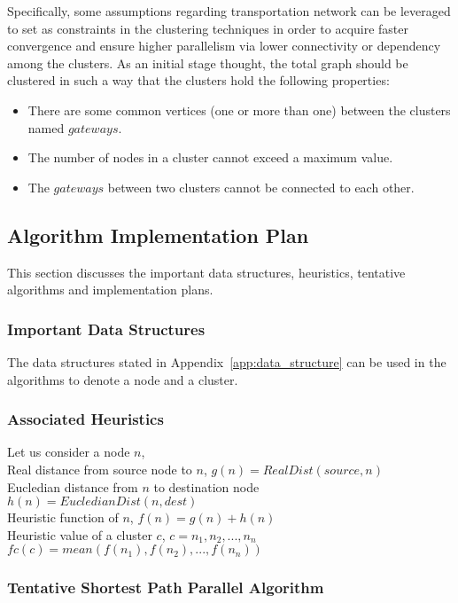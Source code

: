 Specifically, some assumptions regarding transportation network can be leveraged
to set as constraints in the clustering techniques in order to acquire
faster convergence and ensure higher parallelism via lower connectivity or dependency among
the clusters. As an initial stage thought, the total graph should be clustered
in such a way that the clusters hold the following properties:
\begin{itemize}
	\item There are some common vertices (one or more than one) between the clusters named $gateways$.
	\item The number of nodes in a cluster cannot exceed a maximum value.
	\item The $gateways$ between two clusters cannot be connected to each other.
\end{itemize}

\subsection{Algorithm Implementation Plan}

This section discusses the important data structures, heuristics,
tentative algorithms and implementation plans.

\subsubsection{Important Data Structures}

The data structures stated in Appendix~\ref{app:data_structure} can be used in 
the algorithms to denote a node and a cluster.

\subsubsection{Associated Heuristics}

Let us consider a node $n$,
\\Real distance from source node to $n$,
$g(n) = RealDist(source, n)$
\\Eucledian distance from $n$ to destination node
$h(n) = EucledianDist(n, dest)$
\\Heuristic function of $n$,
$f(n) = g(n) + h(n)$
\\Heuristic value of a cluster $c$,
$c = {n_1, n_2, ..., n_n}$
$fc(c) = mean(f(n_1), f(n_2), ..., f(n_n))$

\subsubsection{Tentative Shortest Path Parallel Algorithm}

